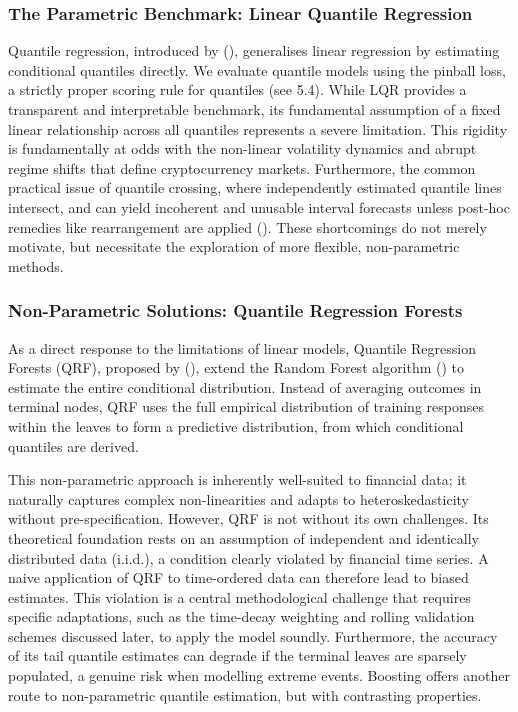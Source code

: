 \documentclass[
  a4paper,
  DIV=11,
  numbers=noendperiod]{scrreprt}
\begin{document}
\subsubsection{The Parametric Benchmark: Linear Quantile
Regression}\label{the-parametric-benchmark-linear-quantile-regression}

Quantile regression, introduced by (), generalises linear regression by estimating
conditional quantiles directly. We evaluate quantile models using the
pinball loss, a strictly proper scoring rule for quantiles (see 5.4).
While LQR provides a transparent and interpretable benchmark, its
fundamental assumption of a fixed linear relationship across all
quantiles represents a severe limitation. This rigidity is fundamentally
at odds with the non-linear volatility dynamics and abrupt regime shifts
that define cryptocurrency markets. Furthermore, the common practical
issue of quantile crossing, where independently estimated quantile lines
intersect, and can yield incoherent and unusable interval forecasts
unless post-hoc remedies like rearrangement are applied
(). These shortcomings do not merely motivate, but
necessitate the exploration of more flexible, non-parametric methods.

\subsubsection{Non-Parametric Solutions: Quantile Regression
Forests}\label{non-parametric-solutions-quantile-regression-forests}

As a direct response to the limitations of linear models, Quantile
Regression Forests (QRF), proposed by
(), extend the Random
Forest algorithm () to estimate
the entire conditional distribution. Instead of averaging outcomes in
terminal nodes, QRF uses the full empirical distribution of training
responses within the leaves to form a predictive distribution, from
which conditional quantiles are derived.

This non-parametric approach is inherently well-suited to financial
data; it naturally captures complex non-linearities and adapts to
heteroskedasticity without pre-specification. However, QRF is not
without its own challenges. Its theoretical foundation rests on an
assumption of independent and identically distributed data (i.i.d.), a
condition clearly violated by financial time series. A naive application
of QRF to time-ordered data can therefore lead to biased estimates. This
violation is a central methodological challenge that requires specific
adaptations, such as the time-decay weighting and rolling validation
schemes discussed later, to apply the model soundly. Furthermore, the
accuracy of its tail quantile estimates can degrade if the terminal
leaves are sparsely populated, a genuine risk when modelling extreme
events. Boosting offers another route to non-parametric quantile
estimation, but with contrasting properties.
\end{document}
